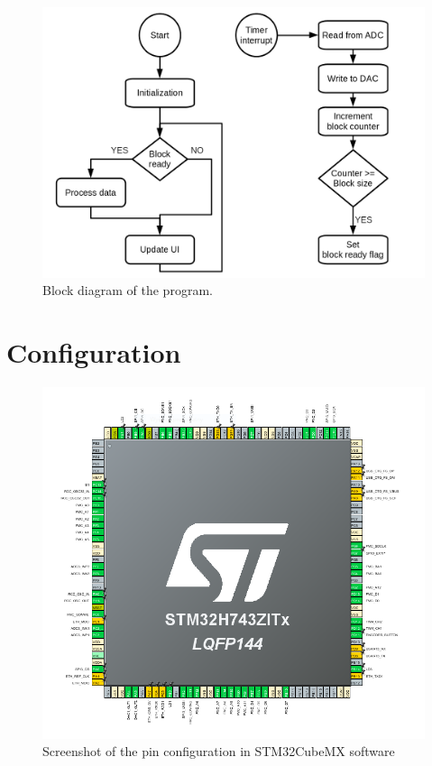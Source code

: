 \documentclass[a4paper,twoside,12pt]{book}
\begin{document}
\begin{figure}[H]
    \centering
    \includegraphics[width=\textwidth]{images/Block2}
    \caption{Block diagram of the program.}
    \label{fig:block2}
\end{figure}

\section{Configuration}

\begin{figure}[H]
    \centering
    \includegraphics[width=\textwidth]{images/pin_overview}
    \caption{Screenshot of the pin configuration in STM32CubeMX software}
    \label{fig:pins}
\end{figure}
\end{document}
